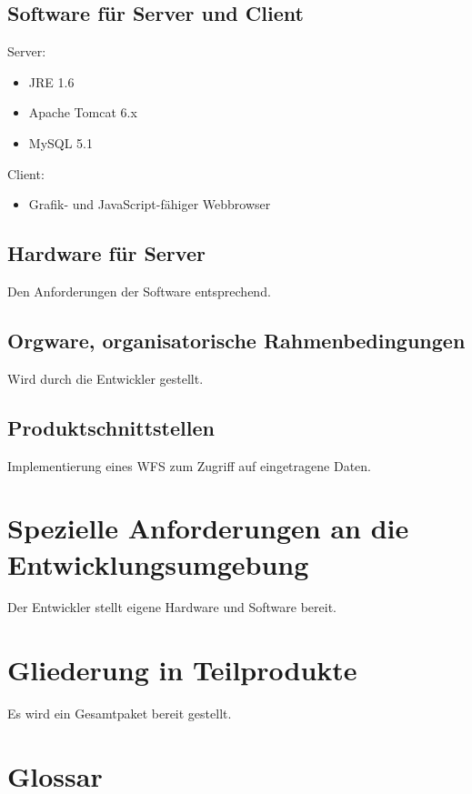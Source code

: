 \documentclass[a4paper,11pt]{scrartcl}
\begin{document}
	\subsection{Software für Server und Client}
		Server:
		\begin{itemize}
			\item JRE 1.6
			\item Apache Tomcat 6.x
			\item MySQL 5.1
		\end{itemize}
		Client:
		\begin{itemize}
			\item Grafik- und JavaScript-fähiger Webbrowser
		\end{itemize}
	\subsection{Hardware für Server}
		Den Anforderungen der Software entsprechend.
	\subsection{Orgware, organisatorische Rahmenbedingungen}
		Wird durch die Entwickler gestellt.
	\subsection{Produktschnittstellen}
		Implementierung eines WFS zum Zugriff auf eingetragene Daten.
\section{Spezielle Anforderungen an die Entwicklungsumgebung}
	Der Entwickler stellt eigene Hardware und Software bereit.
\section{Gliederung in Teilprodukte}
	Es wird ein Gesamtpaket bereit gestellt.

\section{Glossar}
\end{document}
